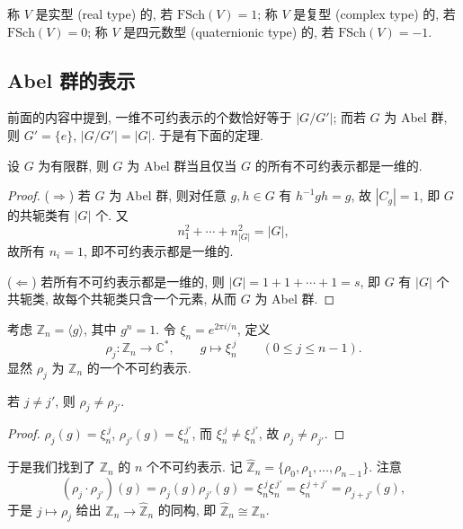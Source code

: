 \begin{definition}\label{def:types}
称 $V$ 是实型 (real type) 的, 若 $\mathrm{FSch}(V)=1$; 称 $V$ 是复型 (complex type)
的, 若 $\mathrm{FSch}(V)=0$; 称 $V$ 是四元数型 (quaternionic type) 的,
若 $\mathrm{FSch}(V)=-1$.
\end{definition}

\subsection{Abel 群的表示}

前面的内容中提到, 一维不可约表示的个数恰好等于 $|G/G'|$;
而若 $G$ 为 Abel 群, 则 $G'=\{e\}$, $|G/G'|=|G|$. 于是有下面的定理.

\begin{theorem}\label{thm:abelian-all-one-dim}
设 $G$ 为有限群, 则 $G$ 为 Abel 群当且仅当 $G$ 的所有不可约表示都是一维的.
\end{theorem}

\begin{proof}
($\Rightarrow$) 若 $G$ 为 Abel 群, 则对任意 $g,h\in G$ 有 $h^{-1}gh=g$,
故 $|C_g|=1$, 即 $G$ 的共轭类有 $|G|$ 个. 又
\[
  n_1^2+\cdots+n_{|G|}^2=|G|,
\]
故所有 $n_i=1$, 即不可约表示都是一维的.

($\Leftarrow$) 若所有不可约表示都是一维的, 则
$|G|=1+1+\cdots+1=s$, 即 $G$ 有 $|G|$ 个共轭类, 故每个共轭类只含一个元素,
从而 $G$ 为 Abel 群.
\end{proof}

\begin{example}\label{ex:Zn-irreducibles}
考虑 $\mathbb{Z}_n=\langle g\rangle$, 其中 $g^n=1$. 令 $\xi_n=e^{2\pi i/n}$, 定义
\[
  \rho_j\colon\mathbb{Z}_n\to\mathbb{C}^*,\qquad g\mapsto\xi_n^{\,j}\qquad(0\le j\le n-1).
\]
显然 $\rho_j$ 为 $\mathbb{Z}_n$ 的一个不可约表示.
\end{example}

\begin{proposition}\label{prop:distinct-irreducibles}
若 $j\ne j'$, 则 $\rho_j\ne\rho_{j'}$.
\end{proposition}

\begin{proof}
$\rho_j(g)=\xi_n^{\,j}$, $\rho_{j'}(g)=\xi_n^{\,j'}$, 而 $\xi_n^{\,j}\ne\xi_n^{\,j'}$,
故 $\rho_j\ne\rho_{j'}$.
\end{proof}

于是我们找到了 $\mathbb{Z}_n$ 的 $n$ 个不可约表示. 记
$\widehat{\mathbb{Z}}_n=\{\rho_0,\rho_1,\dots,\rho_{n-1}\}$. 注意
\[
  (\rho_j\cdot\rho_{j'})(g)=\rho_j(g)\rho_{j'}(g)
  =\xi_n^{\,j}\xi_n^{\,j'}=\xi_n^{\,j+j'}=\rho_{j+j'}(g),
\]
于是 $j\longmapsto\rho_j$ 给出 $\mathbb{Z}_n\to\widehat{\mathbb{Z}}_n$ 的同构, 即 $\widehat{\mathbb{Z}}_n\cong\mathbb{Z}_n$.

